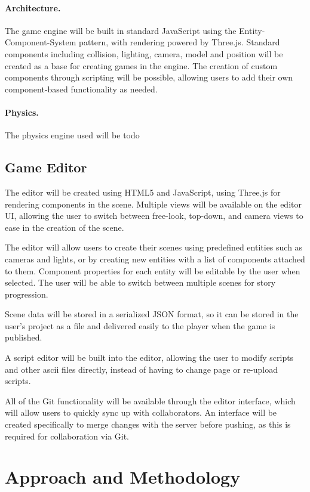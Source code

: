 \documentclass[a4paper, 12pt]{article}
\begin{document}
\paragraph{Architecture.}
The game engine will be built in standard JavaScript using the Entity-Component-System pattern, with rendering powered by Three.js. Standard components including collision, lighting, camera, model and position will be created as a base for creating games in the engine. The creation of custom components through scripting will be possible, allowing users to add their own component-based functionality as needed.

\paragraph{Physics.}
The physics engine used will be todo

\subsection{Game Editor}
The editor will be created using HTML5 and JavaScript, using Three.js for rendering components in the scene. Multiple views will be available on the editor UI, allowing the user to switch between free-look, top-down, and camera views to ease in the creation of the scene.

The editor will allow users to create their scenes using predefined entities such as cameras and lights, or by creating new entities with a list of components attached to them. Component properties for each entity will be editable by the user when selected. The user will be able to switch between multiple scenes for story progression.

Scene data will be stored in a serialized JSON format, so it can be stored in the user's project as a file and delivered easily to the player when the game is published.

A script editor will be built into the editor, allowing the user to modify scripts and other ascii files directly, instead of having to change page or re-upload scripts.

All of the Git functionality will be available through the editor interface, which will allow users to quickly sync up with collaborators. An interface will be created specifically to merge changes with the server before pushing, as this is required for collaboration via Git.

\section{Approach and Methodology}
\end{document}
